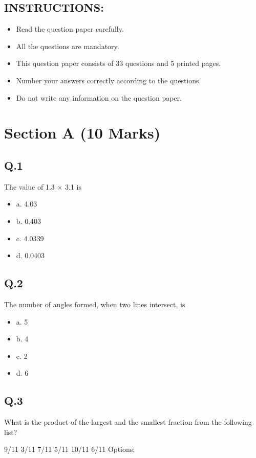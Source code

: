 \documentclass[11pt]{article}
\begin{document}
\subsection*{INSTRUCTIONS:}
\label{sec:org51caf99}

\begin{itemize}
\item Read the question paper carefully.
\item All the questions are mandatory.
\item This question paper consists of 33 questions and 5 printed pages.
\item Number your answers correctly according to the questions.
\item Do not write any information on the question paper.
\end{itemize}
\section*{Section A (10 Marks)}
\label{sec:org2cc35b1}

\subsection*{Q.1}
\label{sec:orgbd7eca0}
The value of 1.3 × 3.1 is
\begin{itemize}
\item a. 4.03
\item b. 0.403
\item c. 4.0339
\item d. 0.0403
\end{itemize}
\subsection*{Q.2}
\label{sec:orgbcfab16}
The number of angles formed, when two lines intersect, is
\begin{itemize}
\item a. 5
\item b. 4
\item c. 2
\item d. 6
\end{itemize}
\subsection*{Q.3}
\label{sec:org222c736}
What is the product of the largest and the smallest fraction from the following list?

9/11
3/11
7/11
5/11
10/11
6/11
Options:
\end{document}

